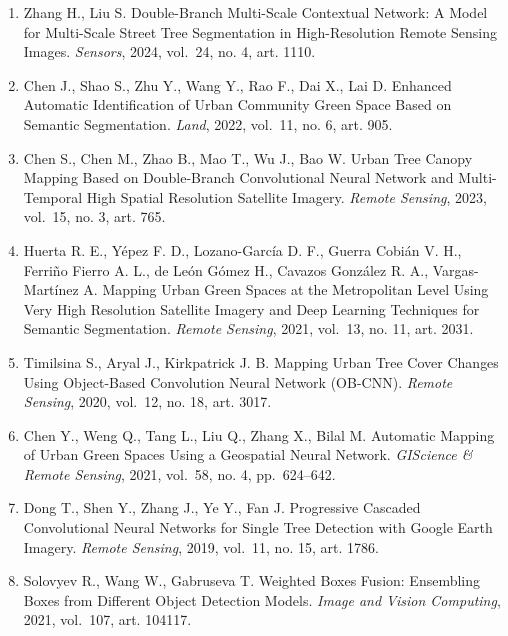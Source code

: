 \begin{enumerate}
\item
  Zhang H., Liu S. Double-Branch Multi-Scale Contextual Network: A Model for Multi-Scale Street Tree Segmentation in High-Resolution Remote Sensing Images. \emph{Sensors}, 2024, vol.~24, no. 4, art. 1110.
\item
  Chen J., Shao S., Zhu Y., Wang Y., Rao F., Dai X., Lai D. Enhanced Automatic Identification of Urban Community Green Space Based on Semantic Segmentation. \emph{Land}, 2022, vol.~11, no. 6, art. 905.
\item
  Chen S., Chen M., Zhao B., Mao T., Wu J., Bao W. Urban Tree Canopy Mapping Based on Double-Branch Convolutional Neural Network and Multi-Temporal High Spatial Resolution Satellite Imagery. \emph{Remote Sensing}, 2023, vol.~15, no. 3, art. 765.
\item
  Huerta R. E., Yépez F. D., Lozano-García D. F., Guerra Cobián V. H., Ferriño Fierro A. L., de León Gómez H., Cavazos González R. A., Vargas-Martínez A. Mapping Urban Green Spaces at the Metropolitan Level Using Very High Resolution Satellite Imagery and Deep Learning Techniques for Semantic Segmentation. \emph{Remote Sensing}, 2021, vol.~13, no. 11, art. 2031.
\item
  Timilsina S., Aryal J., Kirkpatrick J. B. Mapping Urban Tree Cover Changes Using Object-Based Convolution Neural Network (OB-CNN). \emph{Remote Sensing}, 2020, vol.~12, no. 18, art. 3017.
\item
  Chen Y., Weng Q., Tang L., Liu Q., Zhang X., Bilal M. Automatic Mapping of Urban Green Spaces Using a Geospatial Neural Network. \emph{GIScience \& Remote Sensing}, 2021, vol.~58, no. 4, pp.~624--642.
\item
  Dong T., Shen Y., Zhang J., Ye Y., Fan J. Progressive Cascaded Convolutional Neural Networks for Single Tree Detection with Google Earth Imagery. \emph{Remote Sensing}, 2019, vol.~11, no. 15, art. 1786.
\item
  Solovyev R., Wang W., Gabruseva T. Weighted Boxes Fusion: Ensembling Boxes from Different Object Detection Models. \emph{Image and Vision Computing}, 2021, vol.~107, art. 104117.
\end{enumerate}

\newpage

